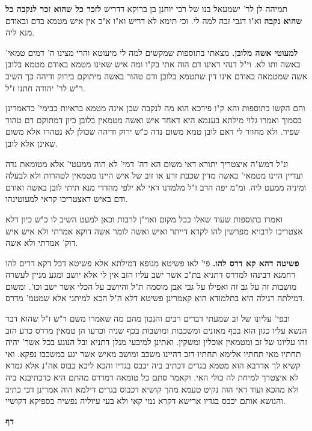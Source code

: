 \documentclass[12pt, openany]{book}
\newcommand{\sethebfont}{
\fontsize{10.5pt}{21.0pt} \selectfont
}
\newcommand{\twocol}[1]{
	{\sethebfont \begin{multicols}{2}
			#1
	\end{multicols}}	
}
\newcommand{\chapname}{}
\newcommand{\newchap}[1]{
	\addcontentsline{toc}{chapter}{#1}
	\renewcommand{\chapname}{#1}
		\begin{center}
			\textbf{%
\fontsize{16pt}{16pt}\selectfont
				#1}
		\end{center}
}
\begin{document}
\twocol{תמיהה לן לר' ישמעאל בנו של רבי יוחנן בן ברוקא דדריש \textbf{לזכר כל שהוא זכר לנקבה כל שהוא נקבה}  וא"ו דגבי זבה למה לי. וכי תימא לא דריש וא"ו א"כ אין איש מטמא בדם ובאודם מנא ליה. 
\par\textbf{למעוטי אשה מלובן.}  מצאתי בתוספות שמקשים למה לי מיעוטא והרי מצינו ה' דמים טמאי' באשה ותו לא. וי"ל דנהי דאינו דם הוה אתי בק"ו ומה איש שאינו מטמא באודם מטמא בלובן אשה שמטמאה באודם אינו דין שתטמא בלובן ודם טהור באשה מיתוקם בירוק ודיהה כך השיב ר"ש לר' יהודה חתנו ז"ל.\par והם הקשו בתוספות והא ק"ו פירכא הוא מה לנקבה שכן אינה מטמא בראיות כבימי' כדאמרינן בסמוך ואמרו גלוי מילתא בענמא היא דאחד איש ואשה מטמאין בלובן כיון דמתוקם דם טהור שפיר. ולא מחוור לי דאם לובן טמא משום נדה כ"ש ירוק ודיהה שכולן לא נטהרו אלא משום שאינן אלא לובן.\par  ונ"ל דמש"ה איצטריך יתורא דאי משום הא דה' דמי' לא הוה ממעטי' אלא מטומאת נדה ועדיין היינו מטמאי' באשה מדין שכבת זרע או זוב של איש היינו מטמאין לטהרות ולא לבעלה ומיניה ממעט ליה. ומ"מ יפה הרב ז"ל מלמדנו דאי לא ילפי מהדדי מנא תיתי לובן באשה ואודם ודם באיש דאצטריכו קראי למעוטינהו.\par  ואמרו בתוספות שעוד שאלו בכל מקום ואוי"ן לרבות וכאן למעט השיב לו כ"ש כיון דלא אצטריכו לרבויא מפרשין להו לקרא דייתר ואיש ואשה לומר אשה דוקא אמרתי ולא איש איש דוק' אמרתי ולא אשה. 
\par\textbf{פשיטה דהא קא דרס להו.}  פי' לאו פשיטא מגופא דמילתא אלא פשיטא דכל דקא דרים להו רחמנא רבינהו למדרס דתניא בת"כ אשר ישב עליו הזב אין לי אלא יושב ומגע מניין לעשרה מושבות זה על גב זה ואפילו על גבי אבן מוסמה ת"ל והיושב על הכלי אשר ישב וכו'. ומשום דמילתה רגילה היא בתלמודא הוא קאמרינן פשיטא דלא ה"ל הכא למיתני אלא שמטמ' מדרס.\par  ובפי' עליונו של זב שמעתי דברים רבים והנכון מהם מה שאמרו משם ר"ש ז"ל שהוא דבר הנשא עליו כגון הוא בכף מאזנים ומשכבות ומושבות בכף שניה וכרעו הן טמאין מדרס כרע הזב זהו עליונו של זב ומטמאין אוכלין ומשקין. ואתינן למיבעי מנלן דתניא ובל הנוגע בכל אשר' יהיה תחתיו מאי תחתיו אלימא תחתיו דזב דהיינו משכב ומושב מאיש אשר יגע במשכבו נפקא. ואי קשיא לך אדרבא הוא מטמא בגדים דכתיב ביה יכבס בגדיו והכא ליכא כבוס אה"נ אלא גמרא לא איצטרך למיחת לה כולי האי. וקאמר סתם כל טומאה דמדרס מהתם היא כדכתיבנא ביה ולא מהכא ועוד דאי הוה נקיט טעמא מהך קושיא דכבוס בגדים דילמא הוה אמרינן דכי כתיב והנושא אותם יכבס בגדיו ארישא דקרא נמי קאי ולא בעי עיוליה נפשיה בספיקא דקושיי. 
\par}
\newchap{דף }
\end{document}
